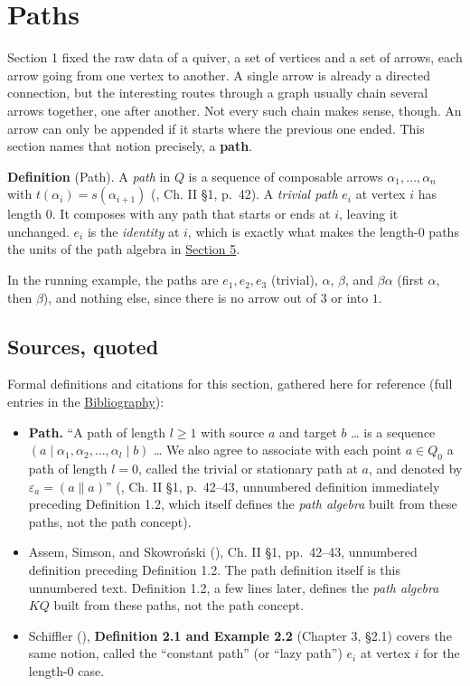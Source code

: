 \section{Paths}\label{sec:12-path-algebras:02-paths:1}

Section 1 fixed the raw data of a quiver, a set of vertices and a set of arrows, each arrow going from one vertex to another. A single arrow is already a directed connection, but the interesting routes through a graph usually chain several arrows together, one after another. Not every such chain makes sense, though. An arrow can only be appended if it starts where the previous one ended. This section names that notion precisely, a \textbf{path}.

\textbf{Definition} (Path). A \emph{path} in \(Q\) is a sequence of composable arrows \(\alpha_1, \dots, \alpha_n\) with \(t(\alpha_i) = s(\alpha_{i+1})\) (\cite{AssemSimsonSkowronski2006}, Ch. II §1, p.~42). A \emph{trivial path} \(e_i\) at vertex \(i\) has length \(0\). It composes with any path that starts or ends at \(i\), leaving it unchanged. \(e_i\) is the \emph{identity} at \(i\), which is exactly what makes the length-\(0\) paths the units of the path algebra in \hyperref[sec:12-path-algebras:05-path-composition:1]{Section 5}.

In the running example, the paths are \(e_1, e_2, e_3\) (trivial), \(\alpha\), \(\beta\), and \(\beta\alpha\) (first \(\alpha\), then \(\beta\)), and nothing else, since there is no arrow out of \(3\) or into \(1\).

\subsection{Sources, quoted}\label{sec:12-path-algebras:02-paths:2}

Formal definitions and citations for this section, gathered here for reference (full entries in the \hyperref[sec:root:bibliography:1]{Bibliography}):

\begin{itemize}
\tightlist
\item
  \textbf{Path.} ``A path of length \(l \geq 1\) with source \(a\) and target \(b\) \ldots{} is a sequence \((a \mid \alpha_1, \alpha_2, \ldots, \alpha_l
  \mid b)\) \ldots{} We also agree to associate with each point \(a \in
  Q_0\) a path of length \(l = 0\), called the trivial or stationary path at \(a\), and denoted by \(\varepsilon_a = (a \| a)\)'' (\cite{AssemSimsonSkowronski2006}, Ch. II §1, p.~42--43, unnumbered definition immediately preceding Definition 1.2, which itself defines the \emph{path algebra} built from these paths, not the path concept).
\item
  Assem, Simson, and Skowroński (\cite{AssemSimsonSkowronski2006}), Ch. II §1, pp.~42--43, unnumbered definition preceding Definition 1.2. The path definition itself is this unnumbered text. Definition 1.2, a few lines later, defines the \emph{path algebra} \(KQ\) built from these paths, not the path concept.
\item
  Schiffler (\cite{Schiffler2014}), \textbf{Definition 2.1 and Example 2.2} (Chapter 3, §2.1) covers the same notion, called the ``constant path'' (or ``lazy path'') \(e_i\) at vertex \(i\) for the length-\(0\) case.
\end{itemize}
